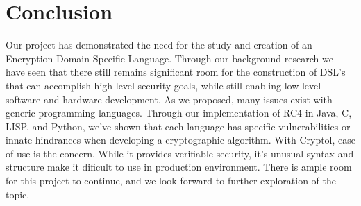 \section{Conclusion}
Our project has demonstrated the need for the study and creation of an Encryption Domain Specific Language. Through our background research we have seen that there still remains significant room for the construction of DSL's that can accomplish high level security goals, while still enabling low level software and hardware development. As we proposed, many issues exist with generic programming languages. Through our implementation of RC4 in Java, C, LISP, and Python, we've shown that each language has specific vulnerabilities or innate hindrances when developing a cryptographic algorithm. With Cryptol, ease of use is the concern. While it provides verifiable security, it's unusual syntax and structure make it dificult to use in production environment. There is ample room for this project to continue, and we look forward to further exploration of the topic.